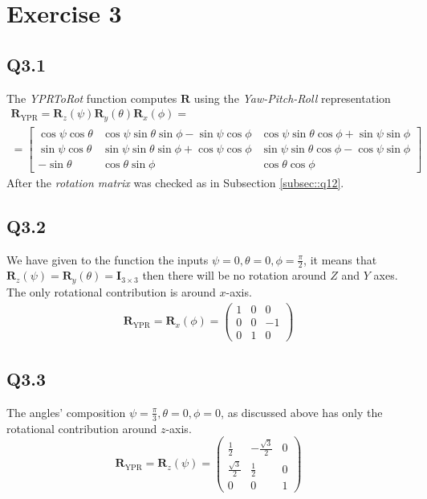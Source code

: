 \section{Exercise 3} \label{P3}

\subsection{Q3.1}
The \textit{YPRToRot} function computes $\mathbf{R}$ using the \textit{Yaw-Pitch-Roll} representation
\begin{gather}
	\mathbf{R}_\text{YPR} = \mathbf{R}_z(\psi)\mathbf{R}_y(\theta)\mathbf{R}_x(\phi) = \nonumber \\ = \begin{bmatrix}
\cos\psi \cos\theta & \cos\psi \sin\theta \sin\phi - \sin\psi \cos\phi & \cos\psi \sin\theta \cos\phi + \sin\psi \sin\phi \\
\sin\psi \cos\theta & \sin\psi \sin\theta \sin\phi + \cos\psi \cos\phi & \sin\psi \sin\theta \cos\phi - \cos\psi \sin\phi \\
-\sin\theta & \cos\theta \sin\phi & \cos\theta \cos\phi
\end{bmatrix}
\end{gather}
After the \textit{rotation matrix} was checked as in Subsection \ref{subsec::q12}.
\subsection{Q3.2}
We have given to the function the inputs $\psi = 0, \theta = 0, \phi = \frac{\pi}{2}$, it means that  $\mathbf{R}_z(\psi) = \mathbf{R}_y(\theta) = \mathbf{I}_{3 \times 3} $ then there will be no rotation around $Z$ and $Y$ axes. The only rotational contribution is around $x$-axis.
\begin{gather}
	\mathbf{R}_\text{YPR} = \mathbf{R}_x(\phi) \nonumber = \begin{pmatrix}
	 1& 0 & 0 \\
	0 & 0 & -1 \\
	0 & 1 & 0
	\end{pmatrix}
\end{gather} 
\subsection{Q3.3}
The angles' composition $\psi = \frac{\pi}{3}, \theta = 0, \phi = 0$, as discussed above has only the rotational contribution around $z$-axis.
\begin{equation*}
\mathbf{R}_\text{YPR} =	\mathbf{R}_z(\psi) = \begin{pmatrix}
        \frac{1}{2}& -\frac{\sqrt{3}}{2} & 0 \\
        \frac{\sqrt{3}}{2} & \frac{1}{2} & 0 \\
        0 & 0 & 1
    \end{pmatrix} 
\end{equation*}

